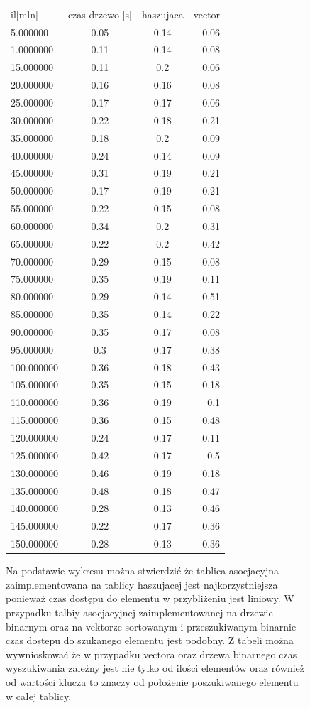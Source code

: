 \documentclass[a4paper,11pt]{report}
\begin{document}
\begin{figure}
\begin{center}
          \begin{tabular}{|l|c|c|r|}
\hline
il[mln] & czas drzewo [s] & haszujaca& vector \\
5.000000 & 0.05& 0.14&0.06\\
1.0000000 &  0.11& 0.14& 0.08\\
15.000000  & 0.11& 0.2&0.06\\
20.000000  & 0.16& 0.16&0.08\\
25.000000  & 0.17& 0.17&0.06\\
30.000000  & 0.22& 0.18& 0.21\\
35.000000 &  0.18& 0.2&0.09\\
40.000000  & 0.24& 0.14&0.09\\
45.000000  & 0.31& 0.19&0.21\\
50.000000  & 0.17& 0.19& 0.21\\
55.000000  & 0.22& 0.15&0.08\\
60.000000  & 0.34& 0.2&0.31\\
65.000000  & 0.22& 0.2& 0.42\\
70.000000  & 0.29& 0.15&0.08\\
75.000000  & 0.35& 0.19&0.11\\
80.000000  & 0.29& 0.14& 0.51\\
85.000000  & 0.35& 0.14&0.22\\
90.000000  & 0.35&  0.17&0.08\\
95.000000  & 0.3& 0.17& 0.38\\
100.000000 &  0.36& 0.18&0.43\\
105.000000 &  0.35& 0.15&0.18\\
110.000000 &  0.36& 0.19&0.1\\
115.000000 &  0.36 & 0.15&0.48\\
120.000000 &  0.24& 0.17&0.11\\
125.000000 &  0.42&  0.17&0.5\\
130.000000 &  0.46&  0.19&0.18\\
135.000000 &  0.48& 0.18&0.47\\
140.000000 & 0.28&  0.13&0.46\\
145.000000 &  0.22& 0.17&0.36\\
150.000000 &  0.28&  0.13&0.36\\
\hline


\hline
\end{tabular}
\newline

  \end{center}
\end{figure}
\begin{figure}
Na podstawie wykresu można stwierdzić że tablica asocjacyjna zaimplementowana na tablicy haszujacej jest najkorzystniejsza ponieważ czas dostępu do elementu w przybliżeniu jest liniowy. 
W przypadku talbiy asocjacyjnej zaimplementowanej na drzewie binarnym oraz na vektorze sortowanym i przeszukiwanym binarnie czas dostepu do szukanego elementu jest podobny. 
Z tabeli można wywnioskować że w przypadku vectora oraz drzewa binarnego czas wyszukiwania zależny jest nie tylko od ilości elementów oraz również od wartości klucza to znaczy od położenie poszukiwanego elementu w całej tablicy. 
\end{figure}
\end{document}

